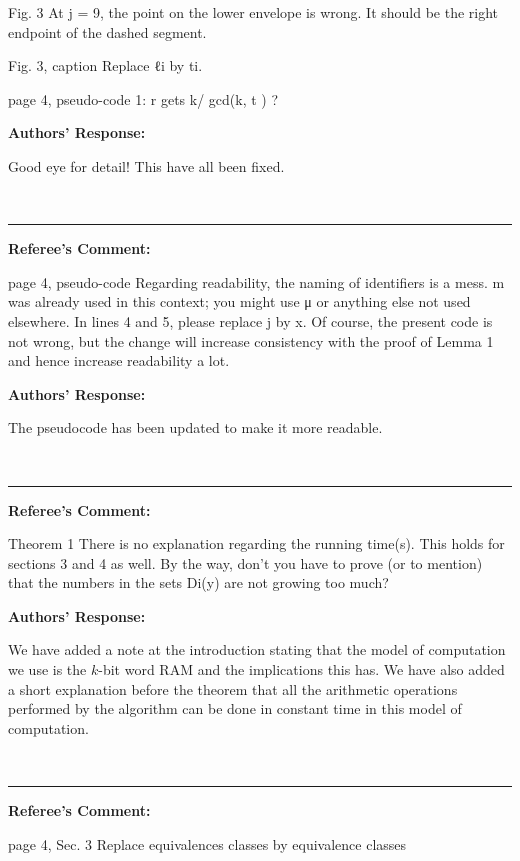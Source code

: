 \documentclass{article}
\begin{document}
Fig. 3 At j = 9, the point on the lower envelope is wrong. It should be the
right endpoint of the dashed segment.

Fig. 3, caption Replace ℓi by ti.

page 4, pseudo-code 1: r gets k/ gcd(k, t ) ?

\noindent\textbf{Authors' Response:}

Good eye for detail!  This have all been fixed.


\ \ \vspace{2ex}\hrule\vspace{2ex}
\noindent\textbf{Referee's Comment:}

page 4, pseudo-code Regarding readability, the naming of identifiers is a
mess. m was already used in this context; you might use μ or anything
else not used elsewhere. In lines 4 and 5, please replace j by x. Of course,
the present code is not wrong, but the change will increase consistency
with the proof of Lemma 1 and hence increase readability a lot.

\noindent\textbf{Authors' Response:}

The pseudocode has been updated to make it more readable.

\ \ \vspace{2ex}\hrule\vspace{2ex}
\noindent\textbf{Referee's Comment:}

Theorem 1 There is no explanation regarding the running time(s). This holds
for sections 3 and 4 as well. By the way, don’t you have to prove (or to
mention) that the numbers in the sets Di(y) are not growing too much?

\noindent\textbf{Authors' Response:}

We have added a note at the introduction stating that the model of
computation we use is the $k$-bit word RAM and the implications this
has.  We have also added a short explanation before the theorem that
all the arithmetic operations performed by the algorithm can be done
in constant time in this model of computation.


\ \ \vspace{2ex}\hrule\vspace{2ex}
\noindent\textbf{Referee's Comment:}

page 4, Sec. 3 Replace equivalences classes by equivalence classes
\end{document}
